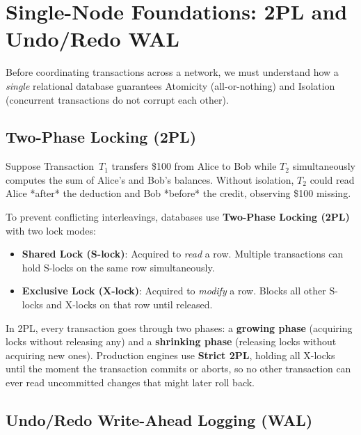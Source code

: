 \section{Single-Node Foundations: 2PL and Undo/Redo WAL}

Before coordinating transactions across a network, we must understand how a \emph{single} relational database guarantees Atomicity (all-or-nothing) and Isolation (concurrent transactions do not corrupt each other).

\subsection{Two-Phase Locking (2PL)}

Suppose Transaction~$T_1$ transfers \$100 from Alice to Bob while $T_2$ simultaneously computes the sum of Alice's and Bob's balances. Without isolation, $T_2$ could read Alice *after* the deduction and Bob *before* the credit, observing \$100 missing.

To prevent conflicting interleavings, databases use \textbf{Two-Phase Locking (2PL)} with two lock modes:
\begin{itemize}[leftmargin=18pt]
  \item \textbf{Shared Lock (S-lock)}: Acquired to \emph{read} a row. Multiple transactions can hold S-locks on the same row simultaneously.
  \item \textbf{Exclusive Lock (X-lock)}: Acquired to \emph{modify} a row. Blocks all other S-locks and X-locks on that row until released.
\end{itemize}
In 2PL, every transaction goes through two phases: a \textbf{growing phase} (acquiring locks without releasing any) and a \textbf{shrinking phase} (releasing locks without acquiring new ones). Production engines use \textbf{Strict 2PL}, holding all X-locks until the moment the transaction commits or aborts, so no other transaction can ever read uncommitted changes that might later roll back.

\subsection{Undo/Redo Write-Ahead Logging (WAL)}

